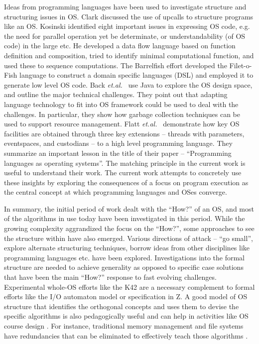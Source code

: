 \documentclass[draft]{article}
\def\etal{{\it et.al.}\ }
\begin{document}
Ideas  from  programming  languages  have  been  used  to  investigate
structure     and     structuring     issues     in     OS.      Clark
\cite{Clark:1985:SSU:323627.323645}  discussed the  use of  upcalls to
structure       programs       like       an       OS.        Kosinski
\cite{Kosinski:1973:DFL:390014.808289}   identified   eight  important
issues in  expressing OS code,  e.g.  the need for  parallel operation
yet be  determinate, or  understandability (of OS  code) in  the large
etc.  He developed  a data flow language based  on function definition
and composition, tried to identify minimal computational function, and
used these to sequence  computations.  The Barrelfish effort developed
the  Filet-o-Fish  language \cite{Dagand:2010:FPD:1713254.1713263}  to
construct  a  domain  specific  languages  (DSL) and  employed  it  to
generate low level OS code.  Back \etal \cite{Back98javaoperating} use
Java to explore  the OS design space, and  outline the major technical
challenges.  They  point out that adapting language  technology to fit
into  OS framework  could be  used to  deal with  the  challenges.  In
particular, they show how garbage collection techniques can be used to
support        resource         management.         Flatt        \etal
\cite{Flatt:1999:PLO:317765.317793} demonstrate  how key OS facilities
are obtained through three  key extensions -- threads with parameters,
eventspaces, and  custodians -- to a high  level programming language.
They  summarize an important  lesson in  the title  of their  paper --
``Programming   languages  as   operating  systems''.    The  matching
principle in the current work is useful to understand their work.  The
current work  attempts to concretely  use these insights  by exploring
the  consequences of  a  focus  on program  execution  as the  central
concept at which programming languages and OSes converge.

In summary, the  initial period of work dealt with  the ``How?'' of an
OS, and most of the algorithms  in use today have been investigated in
this period.   While the growing  complexity aggrandized the  focus on
the ``How?'',  some approaches to  see the structure within  have also
emerged.   Various  directions  of  attack --  ``go  small'',  explore
alternate structuring techniques,  borrow ideas from other disciplines
like programming  languages etc.  have  been explored.  Investigations
into the formal structure are  needed to achieve generality as opposed
to specific case  solutions that have been the  main ``How?'' response
to fast  evolving challenges.  Experimental whole-OS  efforts like the
K42  are  a  necessary  complement  to formal  efforts  like  the  I/O
automaton model or  specification in Z.  A good  model of OS structure
that identifies  the orthogonal concepts  and uses them to  devise the
specific  algorithms is  also  pedagogically useful  and  can help  in
activities like  OS course design \cite{Creak:2000:TOS:506117.506126}.
For  instance, traditional  memory  management and  file systems  have
redundancies  that  can  be  eliminated  to  effectively  teach  those
algorithms \cite{Esser11}.
\end{document}
